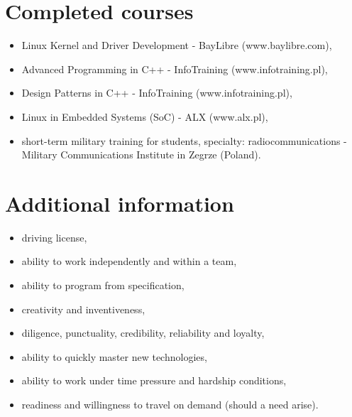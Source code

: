 \documentclass[10pt]{article}
\begin{document}
\section*{Completed courses}
\begin{itemize}
	\item Linux Kernel and Driver Development - BayLibre (www.baylibre.com),
	\item Advanced Programming in C++ - InfoTraining (www.infotraining.pl),
	\item Design Patterns in C++ - InfoTraining (www.infotraining.pl),
	\item Linux in Embedded Systems (SoC) - ALX (www.alx.pl),
	\item short-term military training for students, specialty: radiocommunications - Military
	Communications Institute in Zegrze (Poland).
\end{itemize}

\section*{Additional information}
\begin{itemize}
	\item driving license,
	\item ability to work independently and within a team,
	\item ability to program from specification,
	\item creativity and inventiveness,
	\item diligence, punctuality, credibility, reliability and loyalty,
	\item ability to quickly master new technologies,
	\item ability to work under time pressure and hardship conditions,
	\item readiness and willingness to travel on demand (should a need arise).
\end{itemize}
\end{document}
